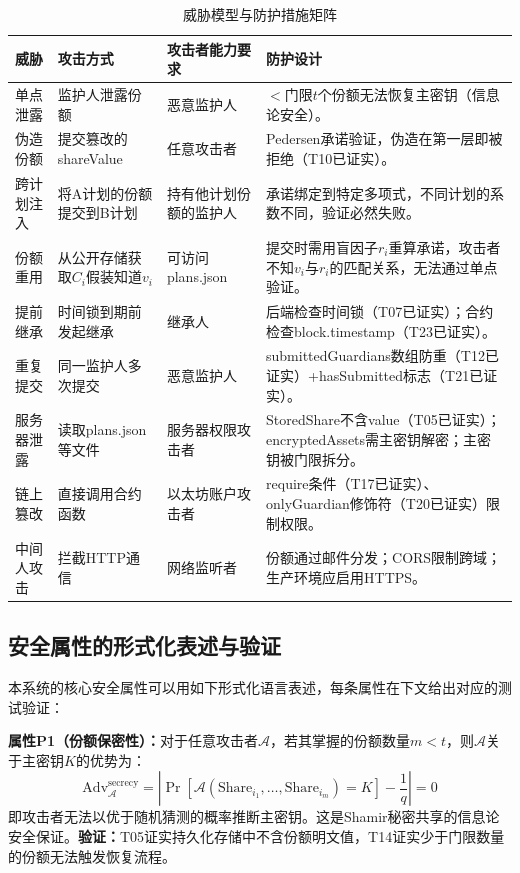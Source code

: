 \documentclass[UTF8,a4paper,zihao=-4,openany]{ctexrep}
\begin{document}
\begin{table}[H]
\centering
\small
\caption{威胁模型与防护措施矩阵}
\setlength{\extrarowheight}{3pt}
\begin{tabularx}{\textwidth}{p{2.5cm}p{3.5cm}p{3.5cm}X}
\toprule
威胁 & 攻击方式 & 攻击者能力要求 & 防护设计\\
\midrule
单点泄露 & 监护人泄露份额 & 恶意监护人 & $<$门限$t$个份额无法恢复主密钥（信息论安全）。\\
伪造份额 & 提交篡改的shareValue & 任意攻击者 & Pedersen承诺验证，伪造在第一层即被拒绝（T10已证实）。\\
跨计划注入 & 将A计划的份额提交到B计划 & 持有他计划份额的监护人 & 承诺绑定到特定多项式，不同计划的系数不同，验证必然失败。\\
份额重用 & 从公开存储获取$C_i$假装知道$v_i$ & 可访问plans.json & 提交时需用盲因子$r_i$重算承诺，攻击者不知$v_i$与$r_i$的匹配关系，无法通过单点验证。\\
提前继承 & 时间锁到期前发起继承 & 继承人 & 后端检查时间锁（T07已证实）；合约检查block.timestamp（T23已证实）。\\
重复提交 & 同一监护人多次提交 & 恶意监护人 & submittedGuardians数组防重（T12已证实）+hasSubmitted标志（T21已证实）。\\
服务器泄露 & 读取plans.json等文件 & 服务器权限攻击者 & StoredShare不含value（T05已证实）；encryptedAssets需主密钥解密；主密钥被门限拆分。\\
链上篡改 & 直接调用合约函数 & 以太坊账户攻击者 & require条件（T17已证实）、onlyGuardian修饰符（T20已证实）限制权限。\\
中间人攻击 & 拦截HTTP通信 & 网络监听者 & 份额通过邮件分发；CORS限制跨域；生产环境应启用HTTPS。\\
\bottomrule
\end{tabularx}
\end{table}

\subsection{安全属性的形式化表述与验证}

本系统的核心安全属性可以用如下形式化语言表述，每条属性在下文给出对应的测试验证：

\textbf{属性P1（份额保密性）：}对于任意攻击者$\mathcal{A}$，若其掌握的份额数量$m < t$，则$\mathcal{A}$关于主密钥$K$的优势为：
\[
\text{Adv}_{\mathcal{A}}^{\text{secrecy}} = \left|\Pr[\mathcal{A}(\text{Share}_{i_1},\dots,\text{Share}_{i_m}) = K] - \frac{1}{q}\right| = 0
\]
即攻击者无法以优于随机猜测的概率推断主密钥。这是Shamir秘密共享的信息论安全保证。\textbf{验证：}T05证实持久化存储中不含份额明文值，T14证实少于门限数量的份额无法触发恢复流程。
\end{document}
